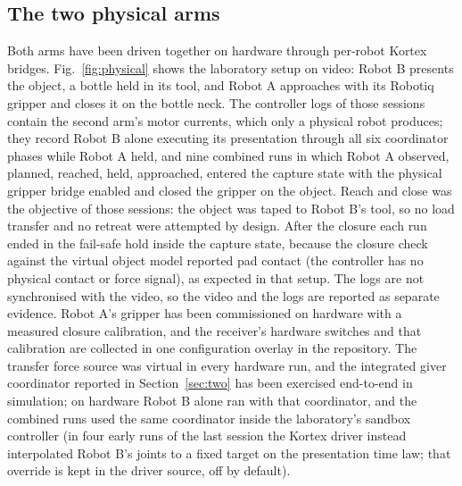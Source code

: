 \documentclass[conference]{IEEEtran}
\begin{document}
\subsection{The two physical arms}
Both arms have been driven together on hardware through per-robot Kortex bridges. Fig.~\ref{fig:physical} shows the laboratory setup on video: Robot B presents the object, a bottle held in its tool, and Robot A approaches with its Robotiq gripper and closes it on the bottle neck. The controller logs of those sessions contain the second arm's motor currents, which only a physical robot produces; they record Robot B alone executing its presentation through all six coordinator phases while Robot A held, and nine combined runs in which Robot A observed, planned, reached, held, approached, entered the capture state with the physical gripper bridge enabled and closed the gripper on the object. Reach and close was the objective of those sessions: the object was taped to Robot B's tool, so no load transfer and no retreat were attempted by design. After the closure each run ended in the fail-safe hold inside the capture state, because the closure check against the virtual object model reported pad contact (the controller has no physical contact or force signal), as expected in that setup. The logs are not synchronised with the video, so the video and the logs are reported as separate evidence. Robot A's gripper has been commissioned on hardware with a measured closure calibration, and the receiver's hardware switches and that calibration are collected in one configuration overlay in the repository. The transfer force source was virtual in every hardware run, and the integrated giver coordinator reported in Section~\ref{sec:two} has been exercised end-to-end in simulation; on hardware Robot B alone ran with that coordinator, and the combined runs used the same coordinator inside the laboratory's sandbox controller (in four early runs of the last session the Kortex driver instead interpolated Robot B's joints to a fixed target on the presentation time law; that override is kept in the driver source, off by default).
\end{document}
